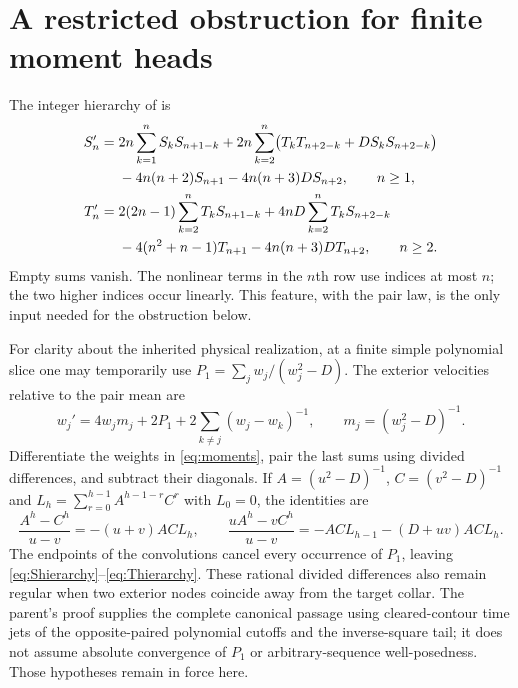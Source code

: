 \section{A restricted obstruction for finite moment heads}
\label{sec:obstruction}

The integer hierarchy of \cite[Section 2, Integer moment evolution]{BakerExterior2026}
is
\begin{align}
 S_n'={}&2n\sum_{k=1}^n S_kS_{n+1-k}
    +2n\sum_{k=2}^n\bigl(T_kT_{n+2-k}+DS_kS_{n+2-k}\bigr)
    \notag\\
    &-4n(n+2)S_{n+1}-4n(n+3)DS_{n+2},\qquad n\ge1,
    \label{eq:Shierarchy}\\
 T_n'={}&2(2n-1)\sum_{k=2}^nT_kS_{n+1-k}
    +4nD\sum_{k=2}^nT_kS_{n+2-k}
    \notag\\
    &-4(n^2+n-1)T_{n+1}-4n(n+3)DT_{n+2},\qquad n\ge2.
    \label{eq:Thierarchy}
\end{align}
Empty sums vanish. The nonlinear terms in the $n$th row use indices
at most $n$; the two higher indices occur linearly. This feature, with
the pair law, is the only input needed for the obstruction below.

For clarity about the inherited physical realization, at a finite
simple polynomial slice one may temporarily use
$P_1=\sum_j w_j/(w_j^2-D)$. The exterior velocities relative to the
pair mean are
\begin{equation}
 w_j'=4w_jm_j+2P_1+2\sum_{k\ne j}(w_j-w_k)^{-1},
 \qquad m_j=(w_j^2-D)^{-1}.
 \label{eq:relative}
\end{equation}
Differentiate the weights in \eqref{eq:moments}, pair the last sums
using divided differences, and subtract their diagonals. If
$A=(u^2-D)^{-1}$, $C=(v^2-D)^{-1}$ and
$L_h=\sum_{r=0}^{h-1}A^{h-1-r}C^r$ with $L_0=0$, the identities are
\begin{equation}
 \frac{A^h-C^h}{u-v}=-(u+v)AC L_h,\qquad
 \frac{uA^h-vC^h}{u-v}=-AC L_{h-1}-(D+uv)AC L_h.
 \label{eq:divdiff}
\end{equation}
The endpoints of the convolutions cancel every occurrence of $P_1$,
leaving \eqref{eq:Shierarchy}--\eqref{eq:Thierarchy}. These rational
divided differences also remain regular when two exterior nodes
coincide away from the target collar. The parent's proof supplies the
complete canonical passage using cleared-contour time jets of the
opposite-paired polynomial cutoffs and the inverse-square tail; it
does not assume absolute convergence of $P_1$ or arbitrary-sequence
well-posedness. Those hypotheses remain in force here.

